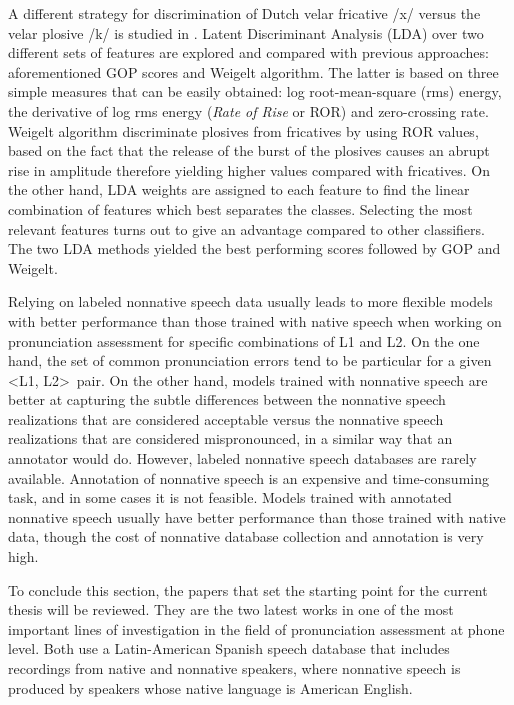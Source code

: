A different strategy for discrimination of Dutch velar fricative /x/ versus the velar plosive
/k/ is studied in \cite{lda_weigelt}. Latent Discriminant Analysis (LDA) over two different sets
of features are explored and compared with previous approaches: aforementioned GOP scores and
Weigelt algorithm. The latter is based on three simple measures that can be easily obtained:
log root-mean-square (rms) energy, the derivative of log rms energy (\textit{Rate of Rise} or
ROR) and zero-crossing rate. Weigelt algorithm discriminate plosives from fricatives by using
ROR values, based on the fact that the release of the burst of the plosives causes an abrupt
rise in amplitude therefore yielding higher values compared with fricatives.
On the other hand, LDA weights are assigned to each feature to 
find the linear combination of features
which best separates the classes. Selecting the most relevant features turns out to give an
advantage compared to other classifiers. The two LDA methods yielded the best performing
scores followed by GOP and Weigelt.

Relying on labeled nonnative speech data usually leads to more flexible models 
with better performance than those trained with native speech
when working on pronunciation assessment for specific combinations of L1 and L2. On the one hand,
the set of common pronunciation errors tend to be particular for a given \textless L1, L2\textgreater \ pair. On the other hand, models trained
with nonnative speech are better at capturing the subtle differences between the nonnative
speech realizations that are considered acceptable versus the nonnative speech realizations
that are considered mispronounced, in a similar way that an annotator would do. 
However, labeled nonnative speech databases are rarely available. Annotation 
of nonnative speech is an expensive and time-consuming task, and in some cases it is not feasible.
Models trained with annotated nonnative speech usually have better performance
than those trained with native data, though the cost of nonnative database 
collection and annotation is very high.

To conclude this section, the papers that set the starting point for the current thesis will
be reviewed. They are the two latest works in one of the most important lines of investigation
in the field of pronunciation assessment at phone level. 
Both use a Latin-American Spanish speech database that includes recordings from 
native and nonnative speakers, where nonnative speech
is produced by speakers whose native language is American English.

